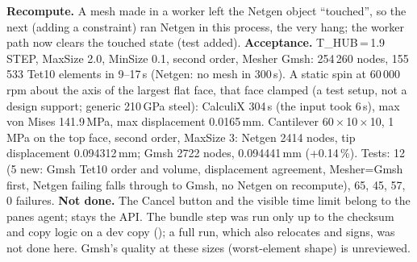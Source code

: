 \textbf{Recompute.} A mesh made in a worker left the Netgen object ``touched'', so the next  (adding a
constraint) ran Netgen in this process, the very hang; the worker path now clears the touched state (test added).
\textbf{Acceptance.} T\_HUB\,=\,1.9 STEP, MaxSize 2.0, MinSize 0.1, second order, Mesher Gmsh: 254\,260 nodes, 155\,533 Tet10
elements in 9--17\,s (Netgen: no mesh in 300\,s). A static spin at 60\,000\,rpm about the axis of the largest flat face, that
face clamped (a test setup, not a design support; generic 210\,GPa steel): CalculiX 304\,s (the input took 6\,s), max von Mises
141.9\,MPa, max displacement 0.0165\,mm. Cantilever 60\,$\times$\,10\,$\times$\,10, 1\,MPa on the top face, second order, MaxSize 3: Netgen
2414 nodes, tip displacement 0.094312\,mm; Gmsh 2722 nodes, 0.094441\,mm (+0.14\,\%). Tests:  12 (5 new:
Gmsh Tet10 order and volume, displacement agreement, Mesher=Gmsh first, Netgen failing falls through to Gmsh, no Netgen on
recompute),  65,  45,  57, 0 failures.
\textbf{Not done.} The Cancel button and the visible time limit belong to the panes agent;  stays the API.
The bundle step was run only up to the checksum and copy logic on a dev copy (); a full 
run, which also relocates and signs, was not done here. Gmsh's quality at these sizes (worst-element shape) is unreviewed.

